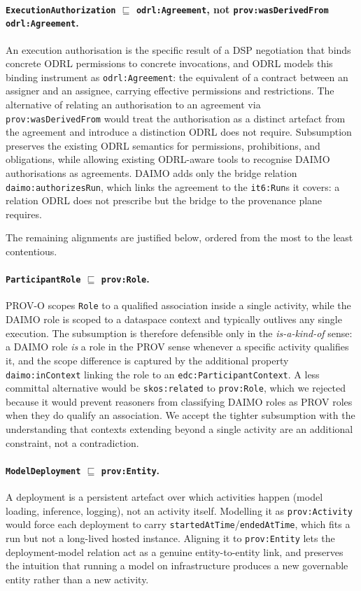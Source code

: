 \documentclass[Afour,sagev,times]{sagej}
\newcommand{\code}[1]{\texttt{#1}}
\begin{document}
\paragraph{\code{ExecutionAuthorization} $\sqsubseteq$ \code{odrl:Agreement}, not \code{prov:wasDerivedFrom odrl:Agreement}.} An execution authorisation is the specific result of a DSP negotiation that binds concrete ODRL permissions to concrete invocations, and ODRL models this binding instrument as \code{odrl:Agreement}: the equivalent of a contract between an assigner and an assignee, carrying effective permissions and restrictions. The alternative of relating an authorisation to an agreement via \code{prov:wasDerivedFrom} would treat the authorisation as a distinct artefact from the agreement and introduce a distinction ODRL does not require. Subsumption preserves the existing ODRL semantics for permissions, prohibitions, and obligations, while allowing existing ODRL-aware tools to recognise DAIMO authorisations as agreements. DAIMO adds only the bridge relation \code{daimo:authorizesRun}, which links the agreement to the \code{it6:Run}s it covers: a relation ODRL does not prescribe but the bridge to the provenance plane requires.

The remaining alignments are justified below, ordered from the most to the least contentious.

\paragraph{\code{ParticipantRole} $\sqsubseteq$ \code{prov:Role}.} PROV-O scopes \code{Role} to a qualified association inside a single activity, while the DAIMO role is scoped to a dataspace context and typically outlives any single execution. The subsumption is therefore defensible only in the \emph{is-a-kind-of} sense: a DAIMO role \emph{is} a role in the PROV sense whenever a specific activity qualifies it, and the scope difference is captured by the additional property \code{daimo:inContext} linking the role to an \code{edc:ParticipantContext}. A less committal alternative would be \code{skos:related} to \code{prov:Role}, which we rejected because it would prevent reasoners from classifying DAIMO roles as PROV roles when they do qualify an association. We accept the tighter subsumption with the understanding that contexts extending beyond a single activity are an additional constraint, not a contradiction.

\paragraph{\code{ModelDeployment} $\sqsubseteq$ \code{prov:Entity}.} A deployment is a persistent artefact over which activities happen (model loading, inference, logging), not an activity itself. Modelling it as \code{prov:Activity} would force each deployment to carry \code{startedAtTime}/\code{endedAtTime}, which fits a run but not a long-lived hosted instance. Aligning it to \code{prov:Entity} lets the deployment-model relation act as a genuine entity-to-entity link, and preserves the intuition that running a model on infrastructure produces a new governable entity rather than a new activity.
\end{document}
